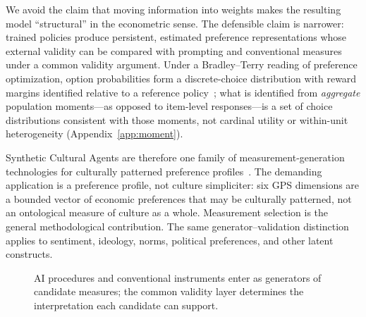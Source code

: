 \documentclass[10pt,letterpaper]{article}
\newcommand{\GPS}{\textsc{gps}}
\newcommand{\Rset}{\mathcal{R}}
\begin{document}
We avoid the claim that moving information into weights makes the resulting model ``structural'' in the econometric sense.
The defensible claim is narrower: trained policies produce persistent, estimated preference representations whose external validity can be compared with prompting and conventional measures under a common validity argument.
Under a Bradley--Terry reading of preference optimization, option probabilities form a discrete-choice distribution with reward margins identified relative to a reference policy~\cite{bradley1952,rafailov2023}; what is identified from \emph{aggregate} population moments---as opposed to item-level responses---is a set of choice distributions consistent with those moments, not cardinal utility or within-unit heterogeneity (Appendix~\ref{app:moment}).

Synthetic Cultural Agents are therefore one family of measurement-generation technologies for culturally patterned preference profiles~\cite{capra2025}.
The demanding application is a preference profile, not culture simpliciter: six GPS dimensions are a bounded vector of economic preferences that may be culturally patterned, not an ontological measure of culture as a whole. Measurement selection is the general methodological contribution.
The same generator--validation distinction applies to sentiment, ideology, norms, political preferences, and other latent constructs.

\begin{figure}[t]
\centering
{}
\caption{AI procedures and conventional instruments enter as generators of candidate measures; the common validity layer determines the interpretation each candidate can support.}
\label{fig:generator}
\end{figure}
\end{document}
